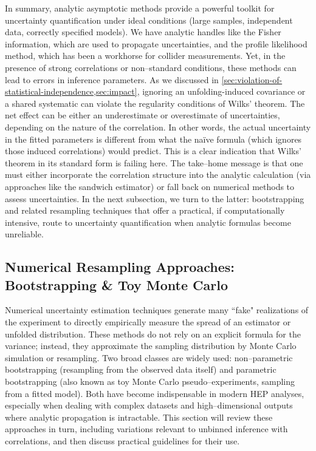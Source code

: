         In summary, analytic asymptotic methods provide a powerful toolkit for uncertainty quantification under ideal conditions (large samples, independent data, correctly specified models).
        We have analytic handles like the Fisher information, which are used to propagate uncertainties, and the profile likelihood method, which has been a workhorse for collider measurements.
        Yet, in the presence of strong correlations or non--standard conditions, these methods can lead to errors in inference parameters.
        As we discussed in \cref{sec:violation-of-statistical-independence,sec:impact}, ignoring an unfolding-induced covariance or a shared systematic can violate the regularity conditions of Wilks’ theorem.
        The net effect can be either an underestimate or overestimate of uncertainties, depending on the nature of the correlation.
        In other words, the actual uncertainty in the fitted parameters is different from what the na\"ive formula (which ignores those induced correlations) would predict.
        This is a clear indication that Wilks' theorem in its standard form is failing here.
        The take--home message is that one must either incorporate the correlation structure into the analytic calculation (via approaches like the sandwich estimator) or fall back on numerical methods to assess uncertainties.
        In the next subsection, we turn to the latter: bootstrapping and related resampling techniques that offer a practical, if computationally intensive, route to uncertainty quantification when analytic formulas become unreliable.

    \subsection{Numerical Resampling Approaches: Bootstrapping \& Toy Monte Carlo}
        Numerical uncertainty estimation techniques generate many ``fake" realizations of the experiment to directly empirically measure the spread of an estimator or unfolded distribution.
        These methods do not rely on an explicit formula for the variance; instead, they approximate the sampling distribution by Monte Carlo simulation or resampling. 
        Two broad classes are widely used: non--parametric bootstrapping (resampling from the observed data itself) and parametric bootstrapping (also known as toy Monte Carlo pseudo--experiments, sampling from a fitted model).
        Both have become indispensable in modern HEP analyses, especially when dealing with complex datasets and high--dimensional outputs where analytic propagation is intractable.
        This section will review these approaches in turn, including variations relevant to unbinned inference with correlations, and then discuss practical guidelines for their use.
